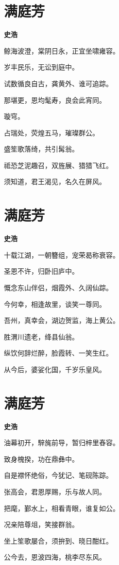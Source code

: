 \documentclass[12pt,a4paper]{ctexbook}
\begin{document}
\section{满庭芳}
\textbf{史浩}\par\vspace{0.5em}
鲸海波澄，棠阴日永，正宜坐啸雍容。\par
岁丰民乐，无讼到庭中。\par
试数循良自古，龚黄外、谁可追踪。\par
那堪更，恩均髦寿，良会此宵同。\par
璇穹。\par
占瑞处，荧煌五马，璀璨群公。\par
盛笙歌落绮，共引髯翁。\par
祗恐芝泥趣召，双旌展、猎猎飞红。\par
须知道，君王渴见，名久在屏风。\par

\section{满庭芳}
\textbf{史浩}\par\vspace{0.5em}
十载江湖，一朝簪组，宠荣曷称衰容。\par
圣恩不许，归卧旧庐中。\par
慨念东山伴侣，烟霞外、久阔仙踪。\par
今何幸，相逢故里，谈笑一尊同。\par
吾州，真幸会，湖边贺监，海上黄公。\par
胜渭川遗老，绛县仙翁。\par
纵饮何辞烂醉，脸霞转、一笑生红。\par
从今后，婆娑化国，千岁乐皇风。\par

\section{满庭芳}
\textbf{史浩}\par\vspace{0.5em}
油幕初开，騂旄前导，暂归梓里舂容。\par
致身槐揆，功在鼎彝中。\par
自是襟怀绝俗，今犹记、笔砚陈踪。\par
张高会，君恩厚赐，乐与故人同。\par
把麾，鄞水上，相看青眼，谁复如公。\par
况亲陪尊俎，笑接群翁。\par
坐上笙歌屡合，须拚到、晓日酣红。\par
公今去，恩波四海，桃李尽东风。\par
\end{document}
